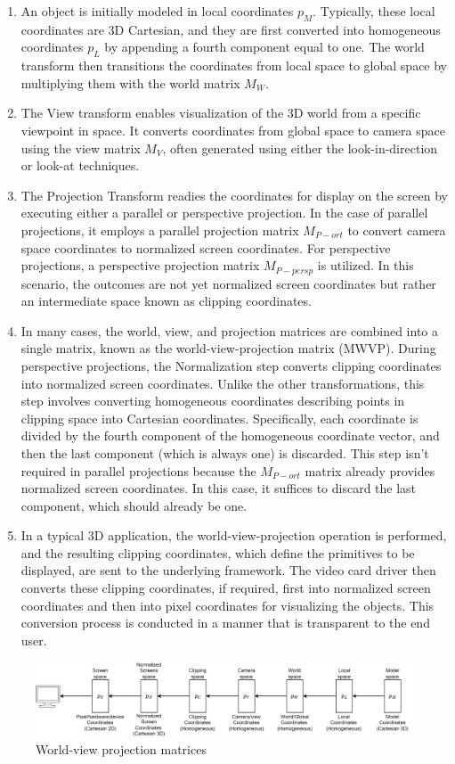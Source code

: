 \begin{enumerate}
    \item An object is initially modeled in local coordinates $p_M$. 
        Typically, these local coordinates are 3D Cartesian, and they are first converted into homogeneous coordinates $p_L$ by appending a fourth component equal to one. 
        The world transform then transitions the coordinates from local space to global space by multiplying them with the world matrix $M_W$. 
    \item The View transform enables visualization of the 3D world from a specific viewpoint in space. 
        It converts coordinates from global space to camera space using the view matrix $M_V$, often generated using either the look-in-direction or look-at techniques.
    \item The Projection Transform readies the coordinates for display on the screen by executing either a parallel or perspective projection. 
        In the case of parallel projections, it employs a parallel projection matrix $M_{P-ort}$ to convert camera space coordinates to normalized screen coordinates. 
        For perspective projections, a perspective projection matrix $M_{P-persp}$ is utilized. 
        In this scenario, the outcomes are not yet normalized screen coordinates but rather an intermediate space known as clipping coordinates.
    \item In many cases, the world, view, and projection matrices are combined into a single matrix, known as the world-view-projection matrix (MWVP).
        During perspective projections, the Normalization step converts clipping coordinates into normalized screen coordinates. Unlike the other transformations, this step involves converting homogeneous coordinates describing points in clipping space into Cartesian coordinates. 
        Specifically, each coordinate is divided by the fourth component of the homogeneous coordinate vector, and then the last component (which is always one) is discarded.
        This step isn't required in parallel projections because the $M_{P-ort}$ matrix already provides normalized screen coordinates. 
        In this case, it suffices to discard the last component, which should already be one.
    \item  In a typical 3D application, the world-view-projection operation is performed, and the resulting clipping coordinates, which define the primitives to be displayed, are sent to the underlying framework. The video card driver then converts these clipping coordinates, if required, first into normalized screen coordinates and then into pixel coordinates for visualizing the objects. 
        This conversion process is conducted in a manner that is transparent to the end user.
\end{enumerate}
\begin{figure}[H]
    \centering
    \includegraphics[width=1\linewidth]{images/proj.png}
    \caption{World-view projection matrices}
\end{figure}